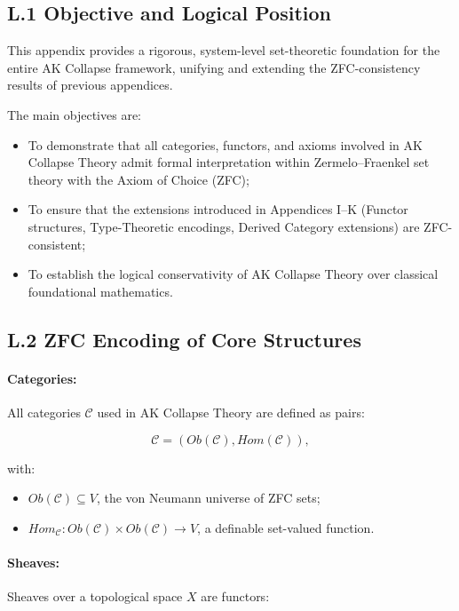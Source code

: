 \documentclass[11pt]{article}
\begin{document}
\subsection*{L.1 Objective and Logical Position}

This appendix provides a rigorous, system-level set-theoretic foundation for the entire AK Collapse framework, unifying and extending the ZFC-consistency results of previous appendices.

The main objectives are:

\begin{itemize}
    \item To demonstrate that all categories, functors, and axioms involved in AK Collapse Theory admit formal interpretation within Zermelo–Fraenkel set theory with the Axiom of Choice (ZFC);
    \item To ensure that the extensions introduced in Appendices I–K (Functor structures, Type-Theoretic encodings, Derived Category extensions) are ZFC-consistent;
    \item To establish the logical conservativity of AK Collapse Theory over classical foundational mathematics.
\end{itemize}

\subsection*{L.2 ZFC Encoding of Core Structures}

\paragraph{Categories:}  
All categories \( \mathcal{C} \) used in AK Collapse Theory are defined as pairs:

\[
\mathcal{C} = (Ob(\mathcal{C}), Hom(\mathcal{C})),
\]

with:

\begin{itemize}
    \item \( Ob(\mathcal{C}) \subseteq V \), the von Neumann universe of ZFC sets;
    \item \( Hom_{\mathcal{C}} : Ob(\mathcal{C}) \times Ob(\mathcal{C}) \to V \), a definable set-valued function.
\end{itemize}

\paragraph{Sheaves:}  
Sheaves over a topological space \( X \) are functors:
\end{document}
